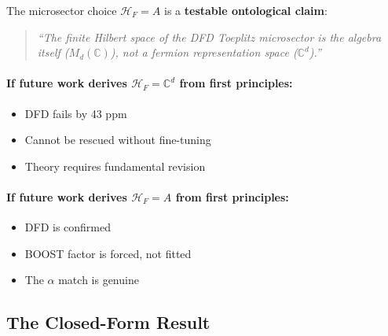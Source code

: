 The microsector choice $\mathcal{H}_F = A$ is a \textbf{testable ontological claim}:

\begin{quote}
\emph{``The finite Hilbert space of the DFD Toeplitz microsector is the algebra itself ($M_d(\mathbb{C})$), not a fermion representation space ($\mathbb{C}^d$).''}
\end{quote}

\paragraph{If future work derives $\mathcal{H}_F = \mathbb{C}^d$ from first principles:}
\begin{itemize}
\item DFD fails by 43 ppm
\item Cannot be rescued without fine-tuning
\item Theory requires fundamental revision
\end{itemize}

\paragraph{If future work derives $\mathcal{H}_F = A$ from first principles:}
\begin{itemize}
\item DFD is confirmed
\item BOOST factor is forced, not fitted
\item The $\alpha$ match is genuine
\end{itemize}

\subsection{The Closed-Form Result}\label{sec:alpha-one-liner}

